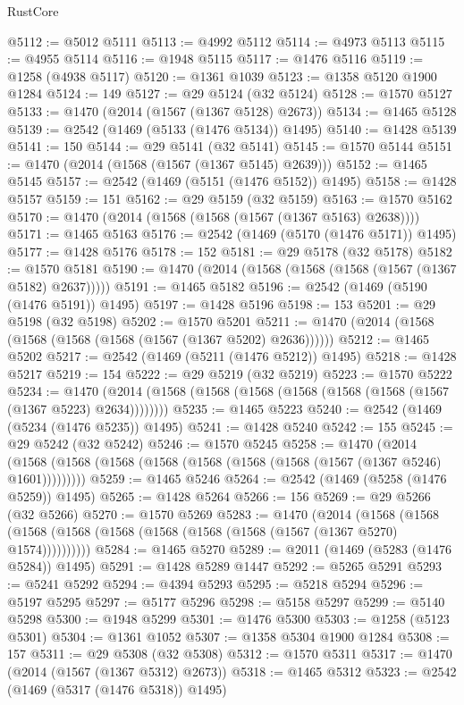 \begin{lexlean}{RustCore}
\begin{coremodule}
@5112 := @5012 @5111
@5113 := @4992 @5112
@5114 := @4973 @5113
@5115 := @4955 @5114
@5116 := @1948 @5115
@5117 := @1476 @5116
@5119 := @1258 (@4938 @5117)
@5120 := @1361 @1039
@5123 := @1358 @5120 @1900 @1284
@5124 := 149
@5127 := @29 @5124 (@32 @5124)
@5128 := @1570 @5127
@5133 := @1470 (@2014 (@1567 (@1367 @5128) @2673))
@5134 := @1465 @5128
@5139 := @2542 (@1469 (@5133 (@1476 @5134)) @1495)
@5140 := @1428 @5139
@5141 := 150
@5144 := @29 @5141 (@32 @5141)
@5145 := @1570 @5144
@5151 := @1470 (@2014 (@1568 (@1567 (@1367 @5145) @2639)))
@5152 := @1465 @5145
@5157 := @2542 (@1469 (@5151 (@1476 @5152)) @1495)
@5158 := @1428 @5157
@5159 := 151
@5162 := @29 @5159 (@32 @5159)
@5163 := @1570 @5162
@5170 := @1470 (@2014 (@1568 (@1568 (@1567 (@1367 @5163) @2638))))
@5171 := @1465 @5163
@5176 := @2542 (@1469 (@5170 (@1476 @5171)) @1495)
@5177 := @1428 @5176
@5178 := 152
@5181 := @29 @5178 (@32 @5178)
@5182 := @1570 @5181
@5190 := @1470 (@2014 (@1568 (@1568 (@1568 (@1567 (@1367 @5182) @2637)))))
@5191 := @1465 @5182
@5196 := @2542 (@1469 (@5190 (@1476 @5191)) @1495)
@5197 := @1428 @5196
@5198 := 153
@5201 := @29 @5198 (@32 @5198)
@5202 := @1570 @5201
@5211 := @1470 (@2014 (@1568 (@1568 (@1568 (@1568 (@1567 (@1367 @5202) @2636))))))
@5212 := @1465 @5202
@5217 := @2542 (@1469 (@5211 (@1476 @5212)) @1495)
@5218 := @1428 @5217
@5219 := 154
@5222 := @29 @5219 (@32 @5219)
@5223 := @1570 @5222
@5234 := @1470 (@2014 (@1568 (@1568 (@1568 (@1568 (@1568 (@1568 (@1567 (@1367 @5223) @2634))))))))
@5235 := @1465 @5223
@5240 := @2542 (@1469 (@5234 (@1476 @5235)) @1495)
@5241 := @1428 @5240
@5242 := 155
@5245 := @29 @5242 (@32 @5242)
@5246 := @1570 @5245
@5258 := @1470
    (@2014 (@1568 (@1568 (@1568 (@1568 (@1568 (@1568 (@1568 (@1567 (@1367 @5246) @1601)))))))))
@5259 := @1465 @5246
@5264 := @2542 (@1469 (@5258 (@1476 @5259)) @1495)
@5265 := @1428 @5264
@5266 := 156
@5269 := @29 @5266 (@32 @5266)
@5270 := @1570 @5269
@5283 := @1470
    (@2014
      (@1568 (@1568 (@1568 (@1568 (@1568 (@1568 (@1568 (@1568 (@1567 (@1367 @5270) @1574))))))))))
@5284 := @1465 @5270
@5289 := @2011 (@1469 (@5283 (@1476 @5284)) @1495)
@5291 := @1428 @5289 @1447
@5292 := @5265 @5291
@5293 := @5241 @5292
@5294 := @4394 @5293
@5295 := @5218 @5294
@5296 := @5197 @5295
@5297 := @5177 @5296
@5298 := @5158 @5297
@5299 := @5140 @5298
@5300 := @1948 @5299
@5301 := @1476 @5300
@5303 := @1258 (@5123 @5301)
@5304 := @1361 @1052
@5307 := @1358 @5304 @1900 @1284
@5308 := 157
@5311 := @29 @5308 (@32 @5308)
@5312 := @1570 @5311
@5317 := @1470 (@2014 (@1567 (@1367 @5312) @2673))
@5318 := @1465 @5312
@5323 := @2542 (@1469 (@5317 (@1476 @5318)) @1495)

\end{coremodule}
\end{lexlean}
